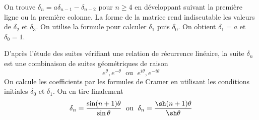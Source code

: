 On trouve $ \delta_{n}=a\delta_{n-1}-\delta_{n-2}$ pour $n\geq4$ en développant suivant la première ligne ou la première colonne.\newline
La forme de la matrice rend indiscutable les valeurs de $\delta_2$ et $\delta_3$. On utilise la formule pour calculer $\delta_1$ puis $\delta_0$. On obtient $\delta_1=a$ et $\delta_0=1$.

D'après l'étude des suites vérifiant une relation de récurrence linéaire, la suite $\delta_n$ est une combinaison de suites géométriques de raison 
\begin{displaymath}
e^{\theta}, e^{-\theta} \;\text{ ou }\; e^{i\theta},e^{-i\theta} 
\end{displaymath}
On calcule les coefficients par les formules de Cramer en utilisant les conditions initiales $\delta_0$ et $\delta_1$. On en tire finalement
\begin{displaymath}
 \delta_n=\frac{\sin(n+1)\theta}{\sin \theta}\;\text{ ou }\;
\delta_n=\frac{\sh(n+1)\theta}{\sh \theta}
\end{displaymath}

